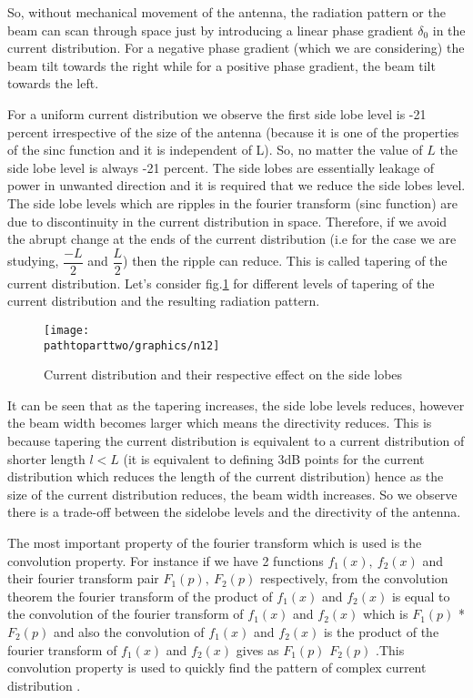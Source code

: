 So, without mechanical movement of the antenna, the radiation pattern or the beam can scan through space just by introducing a linear phase gradient $\delta_0$ in the current distribution. For a negative phase gradient (which we are considering) the beam tilt towards the right while for a positive phase gradient, the beam tilt towards the left.

For a uniform current distribution we observe the first side lobe level is -21 percent irrespective of the size of the antenna (because it is one of the properties of the sinc function and it is independent of L). So, no matter the value of $L$ the side lobe level is always -21 percent. The side lobes are essentially leakage of power in unwanted direction and it is required that we reduce the side lobes level. The side lobe levels which are ripples in the fourier transform (sinc function) are due to discontinuity in the current distribution in space. Therefore, if we avoid the abrupt change at the ends of the current distribution (i.e for the case we are studying, $\dfrac{-L}{2}$ and $\dfrac{L}{2}$) then the ripple can reduce. This is called tapering of the current distribution. Let's consider fig.\ref{fig12} for different levels of tapering of the current distribution and the resulting radiation pattern.
\begin{figure}[h]
\centering
\texttt{[image: \\pathtoparttwo/graphics/n12]}
\caption{Current distribution and their respective effect on the side lobes}
\label{fig12}
\end{figure}

It can be seen that as the tapering increases, the side lobe levels reduces, however the beam width becomes larger which means the directivity reduces. This is because tapering the current distribution is equivalent to a current distribution of shorter length $l < L$ (it is equivalent to defining 3dB points for the current distribution which reduces the length of the current distribution) hence as the size of the current distribution reduces, the beam width increases. So we observe there is a trade-off between the sidelobe levels and the directivity of the antenna.


The most important property of the fourier transform which is used is the convolution property. For instance if we have 2 functions $f_{1}(x),\ f_2(x)$ and
their fourier transform pair $F_1(p),\ F_2(p)$ respectively, from the convolution theorem the fourier transform of the product of $f_{1}(x)$ and $f_{2}(x)$ is equal to the convolution of the fourier transform of $f_1(x)$ and $f_2(x)$ which is $F_{1}(p)$ * $F_{2}(p)$ and also the convolution of $f_{1}(x)$ and $f_{2}(x)$ is the product of the fourier transform of $f_{1}(x)$ and $f_{2}(x)$ gives as $F_{1}(p)$ $F_{2}(p)$ .This convolution property is used to quickly find the pattern of complex current distribution .


